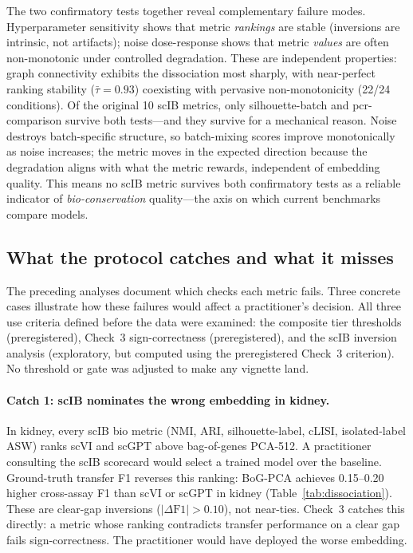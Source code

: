 \documentclass[10pt,letterpaper]{article}
\begin{document}
The two confirmatory tests together reveal complementary failure modes. Hyperparameter sensitivity shows that metric \emph{rankings} are stable (inversions are intrinsic, not artifacts); noise dose-response shows that metric \emph{values} are often non-monotonic under controlled degradation. These are independent properties: graph connectivity exhibits the dissociation most sharply, with near-perfect ranking stability ($\bar{\tau} = 0.93$) coexisting with pervasive non-monotonicity (22/24 conditions). Of the original 10 scIB metrics, only silhouette-batch and pcr-comparison survive both tests---and they survive for a mechanical reason. Noise destroys batch-specific structure, so batch-mixing scores improve monotonically as noise increases; the metric moves in the expected direction because the degradation aligns with what the metric rewards, independent of embedding quality. This means no scIB metric survives both confirmatory tests as a reliable indicator of \emph{bio-conservation} quality---the axis on which current benchmarks compare models.


\subsection{What the protocol catches and what it misses}

The preceding analyses document which checks each metric fails. Three concrete cases illustrate how these failures would affect a practitioner's decision. All three use criteria defined before the data were examined: the composite tier thresholds (preregistered), Check~3 sign-correctness (preregistered), and the scIB inversion analysis (exploratory, but computed using the preregistered Check~3 criterion). No threshold or gate was adjusted to make any vignette land.

\paragraph{Catch 1: scIB nominates the wrong embedding in kidney.} In kidney, every scIB bio metric (NMI, ARI, silhouette-label, cLISI, isolated-label ASW) ranks scVI and scGPT above bag-of-genes PCA-512. A practitioner consulting the scIB scorecard would select a trained model over the baseline. Ground-truth transfer F1 reverses this ranking: BoG-PCA achieves 0.15--0.20 higher cross-assay F1 than scVI or scGPT in kidney (Table~\ref{tab:dissociation}). These are clear-gap inversions ($|\Delta\text{F1}| > 0.10$), not near-ties. Check~3 catches this directly: a metric whose ranking contradicts transfer performance on a clear gap fails sign-correctness. The practitioner would have deployed the worse embedding.
\end{document}
